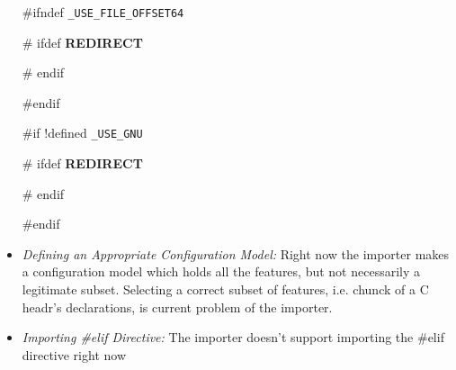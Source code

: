 \documentclass[titlepage]{article}
\begin{document}
\begin{itemize}
\#ifndef \texttt{\_USE\_FILE\_OFFSET64}

\hspace{20pt}\# ifdef \textbf{REDIRECT}
	
\hspace{20pt}\# endif
	
\#endif

\#if !defined \texttt{\_USE\_GNU}

\hspace{20pt}\# ifdef \textbf{REDIRECT}
	
\hspace{20pt}\# endif
	
\#endif



\item \emph{Defining an Appropriate Configuration Model:} Right now the importer makes a configuration model which holds all the features, but not necessarily a legitimate subset. Selecting a correct subset of features, i.e. chunck of a C headr's declarations, is current problem of the importer.

\item \emph{Importing \#elif Directive:} The importer doesn't support importing the \#elif directive right now
\end{itemize}
\end{document}
